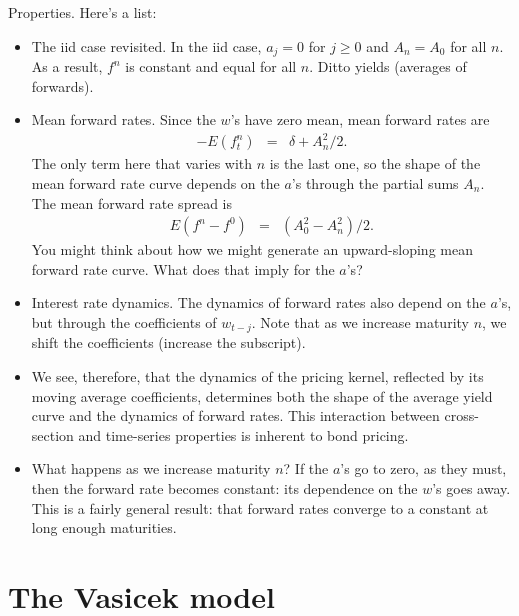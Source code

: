 \documentclass[11pt]{article}
\begin{document}
Properties.
Here's a list:
\begin{itemize}
\item The iid case revisited.
In the iid case, $a_j = 0$ for $j\geq 0$ and $A_n = A_0$ for all $n$.
As a result, $f^n$ is constant and equal for all $n$.
Ditto yields (averages of forwards).
\item Mean forward rates.
Since the $w$'s have zero mean, mean forward rates are
\begin{eqnarray*}
  -  E( f^n_t)
            &=&  \delta + A_n^2/2 .
\end{eqnarray*}
The only term here that varies with $n$ is the last one,
so the shape of the mean forward rate curve depends on the $a$'s through
the partial sums $A_n$.
The mean forward rate spread is
\begin{eqnarray}
    E( f^n - f^0 )
            &=&  (A_0^2 - A_n^2)/2 .
            \label{eq:vasicek-mean-forwards}
\end{eqnarray}
You might think about how we might generate an upward-sloping mean forward
rate curve.  What does that imply for the $a$'s?

\item Interest rate dynamics.
The dynamics of forward rates also depend on the $a$'s,
but through the coefficients of $w_{t-j}$.
Note that as we increase maturity $n$, we shift the coefficients (increase the subscript).

\item We see, therefore, that the dynamics of the pricing kernel,
reflected by its moving average coefficients,
determines both the shape of the average yield curve
and the dynamics of forward rates.
This interaction between cross-section and time-series properties
is inherent to bond pricing.

\item What happens as we increase maturity $n$?
If the $a$'s go to zero, as they must, then the forward rate becomes constant:
its dependence on the $w$'s goes away.
This is a fairly general result:  that forward rates converge
to a constant at long enough maturities.
\end{itemize}



\section{The Vasicek model}
\end{document}
